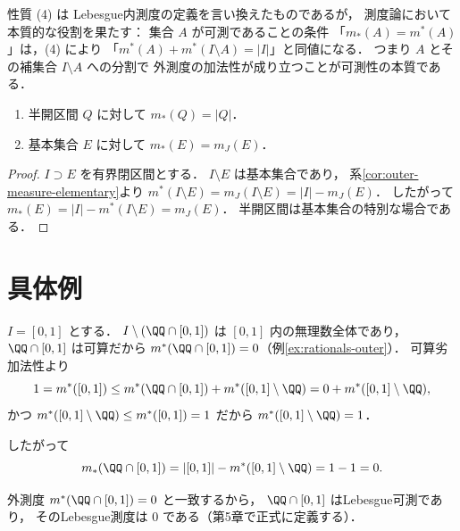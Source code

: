 \begin{remark}
性質 (4) は Lebesgue内測度の定義を言い換えたものであるが，
測度論において本質的な役割を果たす：
集合 $A$ が可測であることの条件
「$m_*(A) = m^*(A)$」は，(4) により
「$m^*(A) + m^*(I \setminus A) = |I|$」と同値になる．
つまり $A$ とその補集合 $I \setminus A$ への分割で
外測度の加法性が成り立つことが可測性の本質である．
\end{remark}

\begin{theorem}[区間・基本集合の内測度]\label{thm:inner-elementary}
\begin{enumerate}
\item 半開区間 $Q$ に対して $m_*(Q) = |Q|$．
\item 基本集合 $E$ に対して $m_*(E) = m_J(E)$．
\end{enumerate}
\end{theorem}
\begin{proof}
$I \supset E$ を有界閉区間とする．
$I \setminus E$ は基本集合であり，
系\ref{cor:outer-measure-elementary}より
$m^*(I \setminus E) = m_J(I \setminus E) = |I| - m_J(E)$．
したがって
$m_*(E) = |I| - m^*(I \setminus E) = m_J(E)$．
半開区間は基本集合の特別な場合である．
\end{proof}

\section{具体例}\label{sec:lebesgue-inner-examples}

\begin{example}\label{ex:rationals-inner}
$I = [0,1]$ とする．
$I \setminus (\QQ \cap [0,1])$
は $[0,1]$ 内の無理数全体であり，
$\QQ \cap [0,1]$ は可算だから
$m^*(\QQ \cap [0,1]) = 0$（例\ref{ex:rationals-outer}）．
可算劣加法性より
\[
1 = m^*([0,1])
\le m^*(\QQ \cap [0,1]) + m^*([0,1] \setminus \QQ)
= 0 + m^*([0,1] \setminus \QQ),
\]
かつ $m^*([0,1] \setminus \QQ) \le m^*([0,1]) = 1$ だから
$m^*([0,1] \setminus \QQ) = 1$．

したがって
\[
m_*(\QQ \cap [0,1])
= |[0,1]| - m^*([0,1] \setminus \QQ)
= 1 - 1 = 0.
\]

外測度 $m^*(\QQ \cap [0,1]) = 0$ と一致するから，
$\QQ \cap [0,1]$ はLebesgue可測であり，
そのLebesgue測度は $0$ である（第5章で正式に定義する）．
\end{example}

